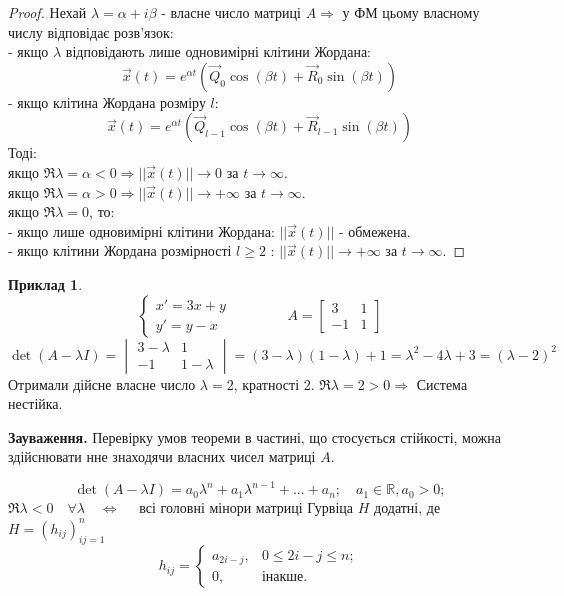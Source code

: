 \documentclass[14pt,a4paper]{scrartcl}
\theoremstyle{definition}
\newtheorem*{example}{Приклад}
\theoremstyle{definition}
\theoremstyle{definition}
\begin{document}
\begin{proof}
Нехай $ \lambda = \alpha + i\beta$ - власне число матриці $A \Rightarrow $ у ФМ цьому власному числу відповідає розв'язок: \\
 - якщо $ \lambda$ відповідають лише одновимірні клітини Жордана:
 $$
 \overrightarrow{x} (t) = e^{\alpha t} ( \overrightarrow{Q} _0 \cos{(\beta t)} + \overrightarrow{R}_0 \sin{(\beta t)} )
$$
- якщо клітина Жордана розміру $l$:
$$
\overrightarrow{x} (t) = e^{\alpha t} ( \overrightarrow{Q} _{l-1} \cos{(\beta t)} + \overrightarrow{R}_{l-1} \sin{(\beta t)} )
$$
Тоді:\\
якщо $ \Re \lambda = \alpha < 0  \Rightarrow || \overrightarrow{x} (t)|| \to 0 $ за $t \to \infty$.\\
якщо $ \Re \lambda = \alpha >0 \Rightarrow || \overrightarrow{x} (t)|| \to + \infty $ за $t \to \infty$.\\
якщо $ \Re \lambda = 0 $, то:\\
\hspace*{1cm} - якщо лише одновимірні клітини Жордана: $||\overrightarrow{x}(t) ||$ - обмежена.\\
\hspace*{1cm} - якщо клітини Жордана розмірності $l \geq 2$ : $ || \overrightarrow{x} (t)|| \to + \infty $ за $t \to \infty. $
\end{proof}
\begin{example}
    $$\begin{cases}
        x' = 3x + y \\
        y' = y-x
    \end{cases} \qquad \qquad A = \begin{bmatrix}
     3 & 1 \\ -1 & 1
    \end{bmatrix}
    $$
    $$
    \det \left( A - \lambda I  \right) = \begin{vmatrix}
      3 - \lambda & 1 \\
      -1 & 1- \lambda
    \end{vmatrix}  = (3 - \lambda) (1- \lambda) + 1 = \lambda^2 - 4 \lambda + 3 = (\lambda-2 )^2
    $$
    Отримали дійсне власне число $\lambda=2$, кратності 2. $ \Re \lambda = 2 > 0 \Rightarrow $ Система нестійка.
\end{example}
\textbf{Зауваження.} Перевірку умов теореми в частині, що стосується стійкості, можна здійснювати нне знаходячи власних чисел матриці $A$.

\begin{spacing}{1.25}
  \begin{boxteo}
  $$
  \det \left( A - \lambda I \right) = a_0 \lambda^n + a_1 \lambda^{n-1} + ... + a_n ; \quad a_1 \in \mathbb{R}, a_0 > 0;
  $$
  $
  \Re \lambda < 0 \quad \forall \lambda \quad \Longleftrightarrow \quad
  $ всі головні мінори матриці Гурвіца $H$ додатні, де $ H =  \left( h_{ij} \right)^n_{ij=1} $
  $$
  h_{ij} = \begin{cases}
      a_{2i-j}, & 0 \leq 2i - j \leq  n;\\
      0 , & \text{інакше.}
  \end{cases}
  $$
  \end{boxteo}
\end{spacing}
\end{document}
